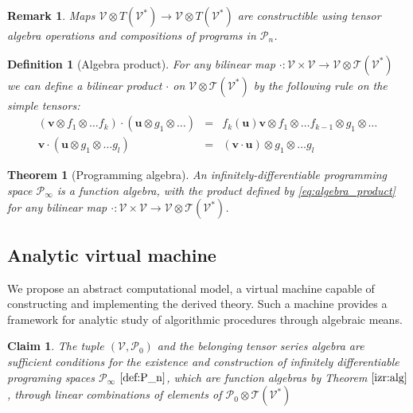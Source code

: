 \documentclass[smallcondensed]{svjour3}
\newcommand{\T}{\mathcal{T}}
\newcommand{\VV}{\mathcal{V}}
\newcommand{\uu}{\mathbf{u}}
\newcommand{\vv}{\mathbf{v}}
\newcommand{\dP}{\mathcal{P}}
\newtheorem{definicija}{Definition}[section]
\newtheorem{trditev}{Claim}[section]
\newtheorem{izrek}{Theorem}[section]
\newtheorem{opomba}{Remark}[section]
\begin{document}
       \begin{opomba}\label{rem:vTen}
       Maps $\VV\otimes T(\VV^*)\to \VV\otimes T(\VV^*)$ are constructible using
       tensor algebra operations and compositions of programs in $\dP_n$.
       \end{opomba}
       
 

\begin{definicija}[Algebra product]
 For any bilinear map $\cdot :\VV\times \VV\to \VV\otimes \T(\VV^*)$ we can define a
 bilinear product $\cdot$ on $\VV\otimes \T(\VV^*)$ by the following rule on the simple
 tensors:
 \begin{eqnarray}
   \label{eq:algebra_product}
   (\vv\otimes f_1\otimes\ldots f_k) \cdot (\uu\otimes g_1\otimes\ldots) &=& 
f_k(\uu)\vv\otimes f_1\otimes\ldots f_{k-1}\otimes g_1\otimes\ldots \\
   \vv\cdot (\uu\otimes g_1\otimes\ldots g_l) &=&  (\vv\cdot \uu)\otimes
    \nonumber                                              g_1\otimes\ldots g_l
 \end{eqnarray}
\end{definicija}
\begin{izrek}[Programming algebra]\label{izr:alg}
An infinitely-differentiable programming space $\dP_\infty$ is a function algebra,
with the product defined by \eqref{eq:algebra_product} for any bilinear map $\cdot :\VV\times \VV\to \VV\otimes \T(\VV^*)$.
\end{izrek}

\subsection{Analytic virtual machine}

We propose an abstract computational model, a virtual machine capable of constructing and implementing the derived theory. Such a machine provides a framework for analytic study of algorithmic procedures through algebraic means.

\begin{trditev}
The tuple  $(\VV,\dP_0)$ and the belonging \emph{tensor series algebra} are sufficient conditions for the existence and construction of \emph{infinitely differentiable programing spaces} $\dP_\infty$ $\eqref{def:P_n}$, which are \emph{function algebras} by Theorem $\ref{izr:alg}$, through linear combinations of elements of $\dP_0\otimes \T(\VV^*)$
\end{trditev}
\end{document}

